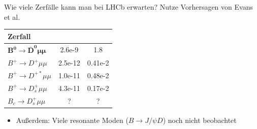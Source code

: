 \documentclass[compress,aspectratio=43]{beamer}
\begin{document}
\begin{frame}{Wie viele Zerfälle kann man bei LHCb erwarten?}
  Nutze Vorhersagen von Evans et al.
  \vspace{0.5em}

  \centering
  \begin{tabular}{l S S}
    \toprule
    Zerfall & {} & {} \\
    \midrule
    $\mathbf{B^0\!\to\! \overline{D}^0\mu\mu}$ & 2.6e-9 & 1.8 \\
    $B^+\!\to\! D^+\mu\mu$ & 2.5e-12 & 0.41e-2 \\
    $B^+\!\to\! D^{+*}\mu\mu$ & 1.0e-11 & 0.48e-2 \\
    $B^+\!\to\! D_s^+\mu\mu$ & 4.3e-11 & 0.17e-2 \\
    $B_c\!\to\!D_s^+\mu\mu$ & ? & ? \\
    \bottomrule
  \end{tabular}
  \begin{itemize}
    \item Außerdem: Viele resonante Moden ($B\!\to\! J\!/\!\psi D$) noch nicht beobachtet
  \end{itemize}
\end{frame}
\end{document}
